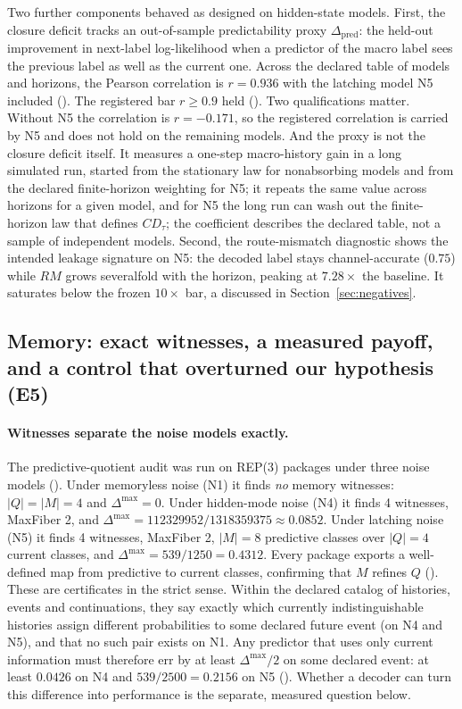 Two further components behaved as designed on hidden-state models. First, the closure deficit tracks an out-of-sample predictability proxy $\Delta_{\mathrm{pred}}$: the held-out improvement in next-label log-likelihood when a predictor of the macro label sees the previous label as well as the current one. Across the declared table of models and horizons, the Pearson correlation is $r = 0.936$ with the latching model N5 included (\gMeasured). %
The registered bar $r \ge 0.9$ held (\gRegPos). %
Two qualifications matter. Without N5 the correlation is $r = -0.171$, so the registered correlation is carried by N5 and does not hold on the remaining models. %
And the proxy is not the closure deficit itself. It measures a one-step macro-history gain in a long simulated run, started from the stationary law for nonabsorbing models and from the declared finite-horizon weighting for N5; it repeats the same value across horizons for a given model, and for N5 the long run can wash out the finite-horizon law that defines $CD_\tau$; the coefficient describes the declared table, not a sample of independent models. Second, the route-mismatch diagnostic shows the intended leakage signature on N5: the decoded label stays channel-accurate ($0.75$) while $RM$ grows severalfold with the horizon, peaking at $7.28\times$ the baseline. It saturates below the frozen $10\times$ bar, a \gRegNeg{} discussed in Section~\ref{sec:negatives}. %

\subsection{Memory: exact witnesses, a measured payoff, and a control that overturned our hypothesis (E5)}
\label{sec:results-memory}

\paragraph{Witnesses separate the noise models exactly.} The predictive-quotient audit was run on REP(3) packages under three noise models (\gExact). Under memoryless noise (N1) it finds \emph{no} memory witnesses: $|Q| = |M| = 4$ and $\Delta^{\max} = 0$. Under hidden-mode noise (N4) it finds 4 witnesses, MaxFiber 2, and $\Delta^{\max} = 112329952/1318359375 \approx 0.0852$. Under latching noise (N5) it finds 4 witnesses, MaxFiber 2, $|M| = 8$ predictive classes over $|Q| = 4$ current classes, and $\Delta^{\max} = 539/1250 = 0.4312$. %
Every package exports a well-defined map from predictive to current classes, confirming that $M$ refines $Q$ (\gExact). %
These are certificates in the strict sense. Within the declared catalog of histories, events and continuations, they say exactly which currently indistinguishable histories assign different probabilities to some declared future event (on N4 and N5), and that no such pair exists on N1. Any predictor that uses only current information must therefore err by at least $\Delta^{\max}/2$ on some declared event: at least $0.0426$ on N4 and $539/2500 = 0.2156$ on N5 (\gExact). %
Whether a decoder can turn this difference into performance is the separate, measured question below.

